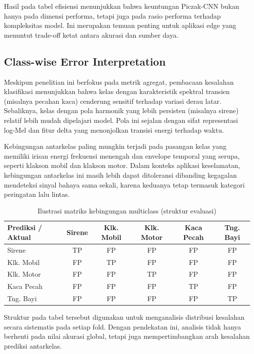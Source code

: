 \documentclass[10pt,a4paper]{jurnalvarian}
\let\LaTeXsubsection\subsection
\def\subsection{\setlength{\leftskip}{0.6cm}\LaTeXsubsection}
\begin{document}
Hasil pada tabel efisiensi menunjukkan bahwa keuntungan Piczak-CNN bukan hanya pada dimensi performa, tetapi juga pada rasio performa terhadap kompleksitas model. Ini merupakan temuan penting untuk aplikasi edge yang menuntut trade-off ketat antara akurasi dan sumber daya.

\subsection{Class-wise Error Interpretation}
Meskipun penelitian ini berfokus pada metrik agregat, pembacaan kesalahan klasifikasi menunjukkan bahwa kelas dengan karakteristik spektral transien (misalnya pecahan kaca) cenderung sensitif terhadap variasi derau latar. Sebaliknya, kelas dengan pola harmonik yang lebih persisten (misalnya sirene) relatif lebih mudah dipelajari model. Pola ini sejalan dengan sifat representasi log-Mel dan fitur delta yang menonjolkan transisi energi terhadap waktu.

Kebingungan antarkelas paling mungkin terjadi pada pasangan kelas yang memiliki irisan energi frekuensi menengah dan envelope temporal yang serupa, seperti klakson mobil dan klakson motor. Dalam konteks aplikasi keselamatan, kebingungan antarkelas ini masih lebih dapat ditoleransi dibanding kegagalan mendeteksi sinyal bahaya sama sekali, karena keduanya tetap termasuk kategori peringatan lalu lintas.

\begin{table}[H]
\centering
\fontsize{8pt}{10pt}\selectfont
\caption{Ilustrasi matriks kebingungan multiclass (struktur evaluasi)}
\begin{tabular}{lccccc}
\hline
Prediksi / Aktual & Sirene & Klk. Mobil & Klk. Motor & Kaca Pecah & Tng. Bayi \\
\hline
Sirene & TP & FP & FP & FP & FP \\
Klk. Mobil & FP & TP & FP & FP & FP \\
Klk. Motor & FP & FP & TP & FP & FP \\
Kaca Pecah & FP & FP & FP & TP & FP \\
Tng. Bayi & FP & FP & FP & FP & TP \\
\hline
\end{tabular}
\end{table}

Struktur pada tabel tersebut digunakan untuk menganalisis distribusi kesalahan secara sistematis pada setiap fold. Dengan pendekatan ini, analisis tidak hanya berhenti pada nilai akurasi global, tetapi juga mempertimbangkan arah kesalahan prediksi antarkelas.
\end{document}
